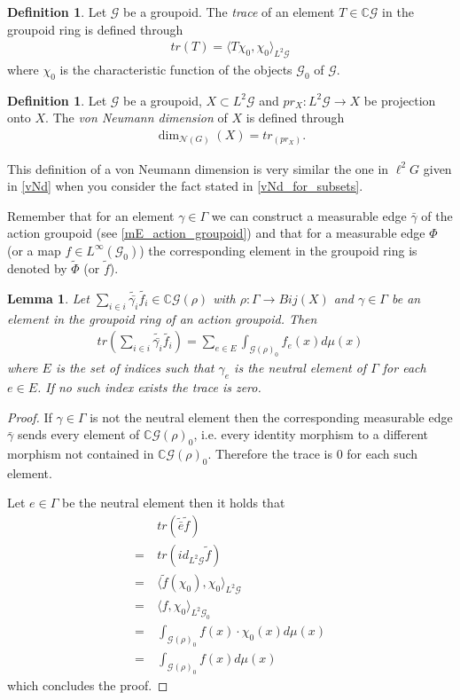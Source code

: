 \documentclass[12pt,a4paper]{scrartcl}
\theoremstyle{plain}
\newtheorem{Lemma}[Theorem]{Lemma}
\theoremstyle{definition}
\newtheorem{Definition}[Theorem]{Definition}
\numberwithin{equation}{section}
\newcommand{\C}{\mathbb{C}} %
\newcommand{\2}{\mathbb{Z} / 2 \mathbb{Z}}
\newcommand{\G}{\mathcal{G}}
\newcommand{\1}{\bar{1}}
\newcommand{\0}{\bar{0}}
\begin{document}
\begin{Definition}
	Let $\G$ be a groupoid. The \emph{trace} of an element $T \in \C \G$ in the groupoid ring is defined through
	\begin{align*}
		tr(T) = \langle T \chi_0, \chi_0 \rangle_{L^2 \G}
	\end{align*}
	where $\chi_0$ is the characteristic function of the objects $\G_0$ of $\G$.
\end{Definition}
\begin{Definition} \label{vNd_of_groupoids}
	Let $\G$ be a groupoid, $X \subset L^2 \G$ and $pr_X: L^2 \G \to X$ be projection onto $X$. The \emph{von Neumann dimension} of $X$ is defined through
	\begin{align*}
		\dim_{\mathcal{N}(G)}(X) = tr_(pr_X).
	\end{align*}
\end{Definition}
This definition of a von Neumann dimension is very similar the one in $\ell^2 G$ given in \ref{vNd} when you consider the fact stated in \ref{vNd_for_subsets}.

Remember that for an element $\gamma \in \Gamma$ we can construct a measurable edge $\bar{\gamma}$ of the action groupoid (see \ref{mE_action_groupoid}) and that for a measurable edge $\Phi$ (or a map $f \in L^\infty (\G_0)$) the corresponding element in the groupoid ring is denoted by $\tilde{\Phi}$ (or $\tilde{f}$).

\begin{Lemma} \label{trgroupoid}
	Let $\sum_{i \in i} \tilde{\bar{\gamma_i}} \tilde{f_i} \in \C\G(\rho)$ with $\rho: \Gamma \to Bij(X)$ and $\gamma \in \Gamma$ be an element in the groupoid ring of an action groupoid. Then
	\begin{align*}
	tr(\sum_{i \in i} \tilde{\bar{\gamma_i}} \tilde{f_i}) = \sum_{e \in E} \int_{\G(\rho)_0} f_e(x) d\mu(x)
	\end{align*}
	where $E$ is the set of indices such that $\gamma_e$ is the neutral element of $\Gamma$ for each $e \in E$. If no such index exists the trace is zero.
\end{Lemma}
\begin{proof} 
	If $\gamma \in \Gamma$ is not the neutral element then the corresponding measurable edge $\bar{\gamma}$ sends every element of $\C\G(\rho)_0$, i.e. every identity morphism to a different morphism not contained in $\C\G(\rho)_0$. Therefore the trace is $0$ for each such element.
	
	Let $e \in \Gamma$ be the neutral element then it holds that
	\begin{align*}
	&~ tr(\tilde{\bar{e}} \tilde{f}) \\
	=&~ tr(id_{L^2 \G} \tilde{f}) \\
	=&~ \langle \tilde{f} (\chi_0), \chi_0 \rangle_{L^2 \G} \\
	=&~ \langle f, \chi_0 \rangle_{L^2 \G_0} \\
	=&~ \int_{\G(\rho)_0} f(x) \cdot \chi_0(x) d\mu(x) \\
	=&~ \int_{\G(\rho)_0} f(x) d\mu(x)
	\end{align*}
	which concludes the proof.
\end{proof}
\end{document}

